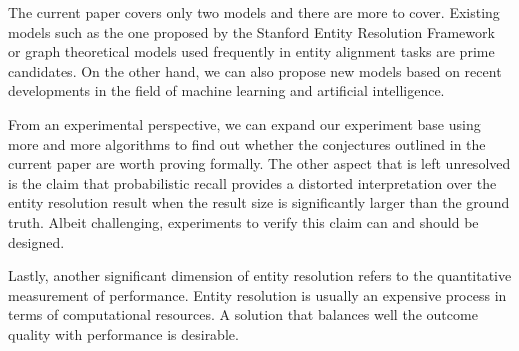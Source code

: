 \documentclass[journal]{IEEEtran}
\begin{document}

    The current paper covers only two models and there are more to cover.
    Existing models such as the one proposed by the Stanford Entity Resolution
    Framework\cite{Ben2009Swoosh} or graph theoretical models used frequently in
    entity alignment tasks are prime candidates.
    On the other hand, we can also propose new models based on recent
    developments in the field of machine learning and artificial intelligence.

    From an experimental perspective, we can expand our experiment base using
    more and more algorithms to find out whether the conjectures outlined in
    the current paper are worth proving formally.
    The other aspect that is left unresolved is the claim that probabilistic
    recall provides a distorted interpretation over the entity resolution result
    when the result size is significantly larger than the ground truth.
    Albeit challenging, experiments to verify this claim can and should be
    designed.

    Lastly, another significant dimension of entity resolution refers to the
    quantitative measurement of performance.
    Entity resolution is usually an expensive process in terms of computational
    resources.
    A solution that balances well the outcome quality with performance is
    desirable.

    \balance
    
    
\end{document}
